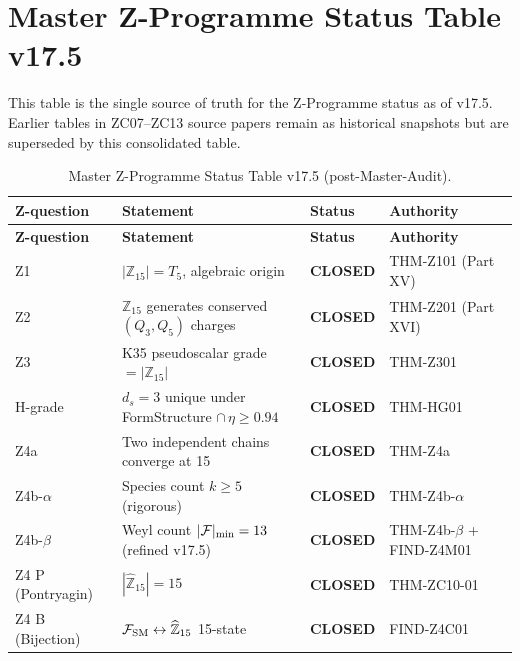 \documentclass[12pt, a4paper]{article}
\begin{document}
\section{Master Z-Programme Status Table v17.5}
\label{sec:master-status}

\begin{keybox}[title={Master Z-Programme Status Table v17.5 (canonical)}]
This table is the single source of truth for the Z-Programme status as
of v17.5. Earlier tables in ZC07--ZC13 source papers remain as
historical snapshots but are superseded by this consolidated table.

{\small
\setlength{\LTpre}{4pt}\setlength{\LTpost}{4pt}
\renewcommand{\arraystretch}{1.30}
\begin{longtable}{p{2.6cm} p{6.0cm} p{1.6cm} p{3.2cm}}
\caption{Master Z-Programme Status Table v17.5 (post-Master-Audit).}\\
\toprule
\textbf{Z-question} & \textbf{Statement} & \textbf{Status} &
\textbf{Authority} \\
\midrule
\endfirsthead
\toprule
\textbf{Z-question} & \textbf{Statement} & \textbf{Status} &
\textbf{Authority} \\
\midrule
\endhead
\bottomrule
\endlastfoot
Z1 & $|\mathbb{Z}_{15}| = T_5$, algebraic origin
   & \textbf{CLOSED} & THM-Z101 (Part XV) \\
Z2 & $\mathbb{Z}_{15}$ generates conserved $(Q_3, Q_5)$ charges
   & \textbf{CLOSED} & THM-Z201 (Part XVI) \\
Z3 & K35 pseudoscalar grade $= |\mathbb{Z}_{15}|$
   & \textbf{CLOSED} & THM-Z301 \\
H-grade & $d_s = 3$ unique under FormStructure $\cap\, \eta \geq 0.94$
   & \textbf{CLOSED} & THM-HG01 \\
Z4a & Two independent chains converge at 15
   & \textbf{CLOSED} & THM-Z4a \\
Z4b-$\alpha$ & Species count $k \geq 5$ (rigorous)
   & \textbf{CLOSED} & THM-Z4b-$\alpha$ \\
Z4b-$\beta$ & Weyl count $|\mathcal{F}|_{\rm min} = 13$ (refined v17.5)
   & \textbf{CLOSED} & THM-Z4b-$\beta$ + FIND-Z4M01 \\
Z4 P (Pontryagin) & $|\widehat{\mathbb{Z}}_{15}| = 15$
   & \textbf{CLOSED} & THM-ZC10-01 \\
Z4 B (Bijection) & $\mathcal{F}_{\rm SM} \leftrightarrow \widehat{\mathbb{Z}}_{15}$ 15-state
   & \textbf{CLOSED} & FIND-Z4C01 \\

\end{longtable}}
\end{keybox}
\end{document}
